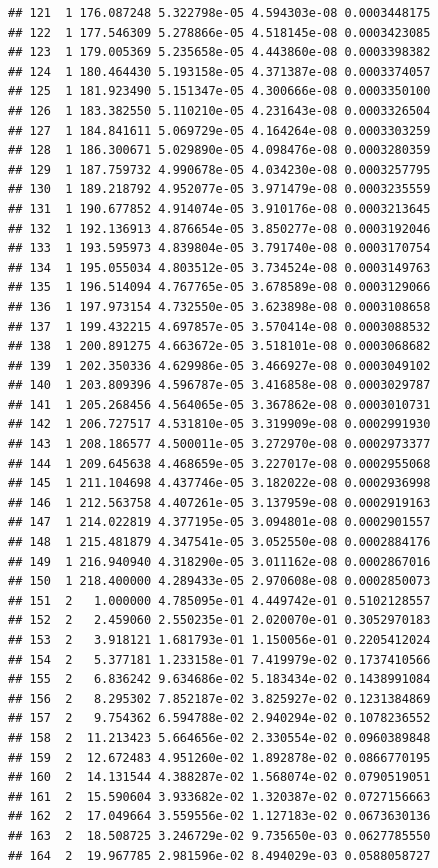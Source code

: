 \documentclass[article]{jss}\usepackage[]{graphicx}\usepackage[]{xcolor}
\makeatletter
\newenvironment{kframe}{%
 \def\at@end@of@kframe{}%
 \ifinner\ifhmode%
  \def\at@end@of@kframe{\end{minipage}}%
  \begin{minipage}{\columnwidth}%
 \fi\fi%
 \def\FrameCommand##1{\hskip\@totalleftmargin \hskip-\fboxsep
 \colorbox{shadecolor}{##1}\hskip-\fboxsep
     \hskip-\linewidth \hskip-\@totalleftmargin \hskip\columnwidth}%
 \MakeFramed {\advance\hsize-\width
   \@totalleftmargin\z@ \linewidth\hsize
   \@setminipage}}%
 {\par\unskip\endMakeFramed%
 \at@end@of@kframe}
\newenvironment{knitrout}{}{} %
\makeatother
\begin{document}
\begin{knitrout}
\begin{kframe}
\begin{verbatim}
## 121  1 176.087248 5.322798e-05 4.594303e-08 0.0003448175
## 122  1 177.546309 5.278866e-05 4.518145e-08 0.0003423085
## 123  1 179.005369 5.235658e-05 4.443860e-08 0.0003398382
## 124  1 180.464430 5.193158e-05 4.371387e-08 0.0003374057
## 125  1 181.923490 5.151347e-05 4.300666e-08 0.0003350100
## 126  1 183.382550 5.110210e-05 4.231643e-08 0.0003326504
## 127  1 184.841611 5.069729e-05 4.164264e-08 0.0003303259
## 128  1 186.300671 5.029890e-05 4.098476e-08 0.0003280359
## 129  1 187.759732 4.990678e-05 4.034230e-08 0.0003257795
## 130  1 189.218792 4.952077e-05 3.971479e-08 0.0003235559
## 131  1 190.677852 4.914074e-05 3.910176e-08 0.0003213645
## 132  1 192.136913 4.876654e-05 3.850277e-08 0.0003192046
## 133  1 193.595973 4.839804e-05 3.791740e-08 0.0003170754
## 134  1 195.055034 4.803512e-05 3.734524e-08 0.0003149763
## 135  1 196.514094 4.767765e-05 3.678589e-08 0.0003129066
## 136  1 197.973154 4.732550e-05 3.623898e-08 0.0003108658
## 137  1 199.432215 4.697857e-05 3.570414e-08 0.0003088532
## 138  1 200.891275 4.663672e-05 3.518101e-08 0.0003068682
## 139  1 202.350336 4.629986e-05 3.466927e-08 0.0003049102
## 140  1 203.809396 4.596787e-05 3.416858e-08 0.0003029787
## 141  1 205.268456 4.564065e-05 3.367862e-08 0.0003010731
## 142  1 206.727517 4.531810e-05 3.319909e-08 0.0002991930
## 143  1 208.186577 4.500011e-05 3.272970e-08 0.0002973377
## 144  1 209.645638 4.468659e-05 3.227017e-08 0.0002955068
## 145  1 211.104698 4.437746e-05 3.182022e-08 0.0002936998
## 146  1 212.563758 4.407261e-05 3.137959e-08 0.0002919163
## 147  1 214.022819 4.377195e-05 3.094801e-08 0.0002901557
## 148  1 215.481879 4.347541e-05 3.052550e-08 0.0002884176
## 149  1 216.940940 4.318290e-05 3.011162e-08 0.0002867016
## 150  1 218.400000 4.289433e-05 2.970608e-08 0.0002850073
## 151  2   1.000000 4.785095e-01 4.449742e-01 0.5102128557
## 152  2   2.459060 2.550235e-01 2.020070e-01 0.3052970183
## 153  2   3.918121 1.681793e-01 1.150056e-01 0.2205412024
## 154  2   5.377181 1.233158e-01 7.419979e-02 0.1737410566
## 155  2   6.836242 9.634686e-02 5.183434e-02 0.1438991084
## 156  2   8.295302 7.852187e-02 3.825927e-02 0.1231384869
## 157  2   9.754362 6.594788e-02 2.940294e-02 0.1078236552
## 158  2  11.213423 5.664656e-02 2.330554e-02 0.0960389848
## 159  2  12.672483 4.951260e-02 1.892878e-02 0.0866770195
## 160  2  14.131544 4.388287e-02 1.568074e-02 0.0790519051
## 161  2  15.590604 3.933682e-02 1.320387e-02 0.0727156663
## 162  2  17.049664 3.559556e-02 1.127183e-02 0.0673630136
## 163  2  18.508725 3.246729e-02 9.735650e-03 0.0627785550
## 164  2  19.967785 2.981596e-02 8.494029e-03 0.0588058727

\end{verbatim}
\end{kframe}
\end{knitrout}
\end{document}
